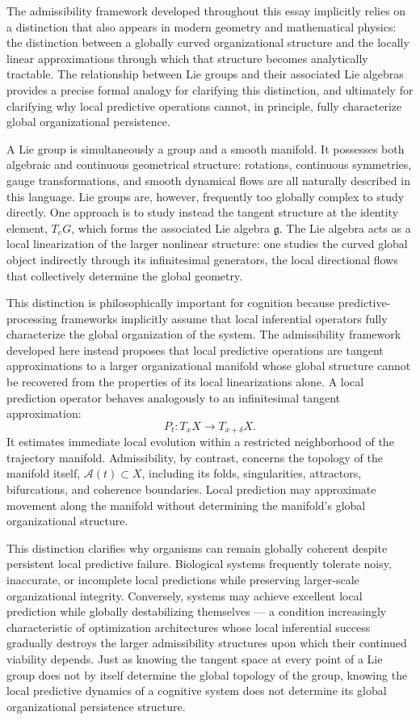 \documentclass[12pt,a4paper]{report}
\theoremstyle{flyxion}
\begin{document}
The admissibility framework developed throughout this essay implicitly relies on a distinction that also appears in modern geometry and mathematical physics: the distinction between a globally curved organizational structure and the locally linear approximations through which that structure becomes analytically tractable. The relationship between Lie groups and their associated Lie algebras provides a precise formal analogy for clarifying this distinction, and ultimately for clarifying why local predictive operations cannot, in principle, fully characterize global organizational persistence.

A Lie group is simultaneously a group and a smooth manifold. It possesses both algebraic and continuous geometrical structure: rotations, continuous symmetries, gauge transformations, and smooth dynamical flows are all naturally described in this language. Lie groups are, however, frequently too globally complex to study directly. One approach is to study instead the tangent structure at the identity element, $T_e G$, which forms the associated Lie algebra $\mathfrak{g}$. The Lie algebra acts as a local linearization of the larger nonlinear structure: one studies the curved global object indirectly through its infinitesimal generators, the local directional flows that collectively determine the global geometry.

This distinction is philosophically important for cognition because predictive-processing frameworks implicitly assume that local inferential operators fully characterize the global organization of the system. The admissibility framework developed here instead proposes that local predictive operations are tangent approximations to a larger organizational manifold whose global structure cannot be recovered from the properties of its local linearizations alone. A local prediction operator behaves analogously to an infinitesimal tangent approximation:
\[
P_t : T_x X \rightarrow T_{x+\delta} X.
\]
It estimates immediate local evolution within a restricted neighborhood of the trajectory manifold. Admissibility, by contrast, concerns the topology of the manifold itself, $\mathcal{A}(t) \subset X$, including its folds, singularities, attractors, bifurcations, and coherence boundaries. Local prediction may approximate movement along the manifold without determining the manifold's global organizational structure.

This distinction clarifies why organisms can remain globally coherent despite persistent local predictive failure. Biological systems frequently tolerate noisy, inaccurate, or incomplete local predictions while preserving larger-scale organizational integrity. Conversely, systems may achieve excellent local prediction while globally destabilizing themselves --- a condition increasingly characteristic of optimization architectures whose local inferential success gradually destroys the larger admissibility structures upon which their continued viability depends. Just as knowing the tangent space at every point of a Lie group does not by itself determine the global topology of the group, knowing the local predictive dynamics of a cognitive system does not determine its global organizational persistence structure.
\end{document}

